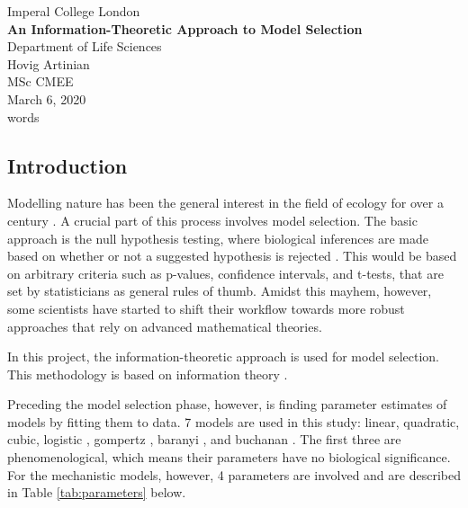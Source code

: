 \documentclass[11pt]{article}
\newcommand\wordcount{}
\begin{document}
	\begin{titlepage}
		\centering
		\vspace*{\fill}
		Imperal College London\\
		\textbf{An Information-Theoretic Approach to Model Selection}\\
		Department of Life Sciences\\
		\hfill \break
		\hfill \break
		Hovig Artinian\\
		MSc CMEE\\
		March 6, 2020\\
		\wordcount words
		\vspace*{\fill}
	\end{titlepage}


	\tableofcontents
	
	\newpage
	\begin{linenumbers}
	\section{Introduction}

	Modelling nature has been the general interest in the field of ecology for over a century \cite{Kingsland1995}. A crucial part of this process involves model selection. The basic approach is the null hypothesis testing, where biological inferences are made based on whether or not a suggested hypothesis is rejected \cite{Johnson2004}. This would be based on arbitrary criteria such as p-values, confidence intervals, and t-tests, that are set by statisticians as general rules of thumb. Amidst this mayhem, however, some scientists have started to shift their workflow towards more robust approaches that rely on advanced mathematical theories.
	\par In this project, the information-theoretic approach is used for model selection. This methodology is based on information theory \cite{Guiasu1977}.
	\par Preceding the model selection phase, however, is finding parameter estimates of models by fitting them to data. 7 models are used in this study: linear, quadratic, cubic, logistic \cite{Pearl1920}, gompertz \cite{Zwietering1990}, baranyi \cite{Baranyi1994}, and buchanan \cite{Buchanan1997}. The first three are phenomenological, which means their parameters have no biological significance. For the mechanistic models, however, 4 parameters are involved and are described in Table \ref{tab:parameters} below.
	

\end{linenumbers}
\end{document}
